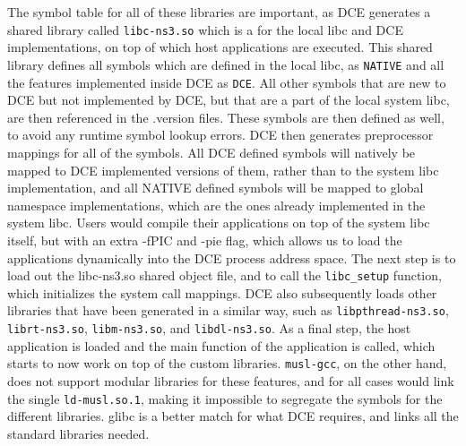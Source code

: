 \documentclass{sig-alternate}
\begin{document}
The symbol table for all of these libraries are important, as DCE generates a shared library called \texttt{libc-ns3.so} which is a 
for the local libc and DCE implementations, on top of which host applications are executed. This shared library defines 
all symbols which are defined in the local libc, as \texttt{NATIVE} and all the features implemented inside DCE as \texttt{DCE}. All other symbols that are new to DCE but not implemented by DCE, but that are a part of the local system libc, are then referenced in the .version files.  These symbols are then defined 
as well, to avoid any runtime symbol lookup errors. DCE then generates preprocessor mappings for all of the symbols. All DCE defined symbols will 
natively be mapped to DCE implemented versions of them, rather than to the system libc implementation, and all NATIVE defined symbols will be mapped 
to global namespace implementations, which are the ones already implemented in the system libc. Users would compile their applications on top of 
the system libc itself, but with an extra -fPIC and -pie flag, which allows us to load the applications dynamically into the DCE process address 
space. The next step is to load out the libc-ns3.so shared object file, and to call the \texttt{libc\_setup} function, which initializes the system call mappings. DCE also 
subsequently loads other libraries that have been generated in a similar way, such as \texttt{libpthread-ns3.so}, \texttt{librt-ns3.so}, \texttt{libm-ns3.so}, and \texttt{libdl-ns3.so}.
As a final step, the host application is loaded and the main function of the application is called, which starts to now work on top of the custom libraries.
\texttt{musl-gcc}, on the other hand, does not support modular libraries for these features, and for all cases would link the single \texttt{ld-musl.so.1}, making it 
impossible to segregate the symbols for the different libraries. glibc is a better match for what DCE requires, and links all the standard libraries needed.
\end{document}

